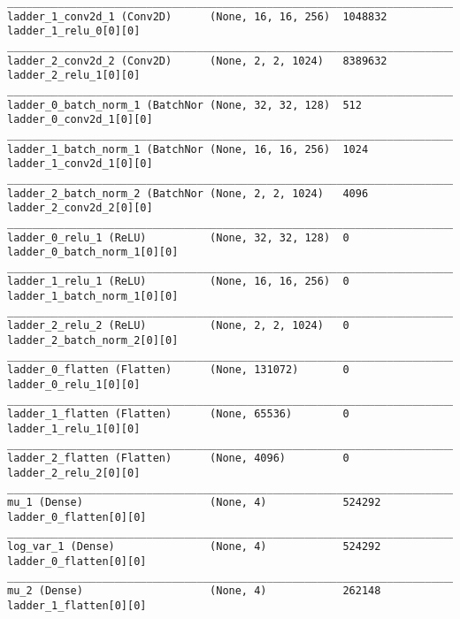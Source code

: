 \begin{lstlisting}[caption={\textsc{Mnist}-\ac{VLAE}-\ac{GAN} Encoder},captionpos=b,basicstyle=\tiny, label={lst:mnist-vlae-gan-encoder}]
__________________________________________________________________________________________________
ladder_1_conv2d_1 (Conv2D)      (None, 16, 16, 256)  1048832     ladder_1_relu_0[0][0]
__________________________________________________________________________________________________
ladder_2_conv2d_2 (Conv2D)      (None, 2, 2, 1024)   8389632     ladder_2_relu_1[0][0]
__________________________________________________________________________________________________
ladder_0_batch_norm_1 (BatchNor (None, 32, 32, 128)  512         ladder_0_conv2d_1[0][0]
__________________________________________________________________________________________________
ladder_1_batch_norm_1 (BatchNor (None, 16, 16, 256)  1024        ladder_1_conv2d_1[0][0]
__________________________________________________________________________________________________
ladder_2_batch_norm_2 (BatchNor (None, 2, 2, 1024)   4096        ladder_2_conv2d_2[0][0]
__________________________________________________________________________________________________
ladder_0_relu_1 (ReLU)          (None, 32, 32, 128)  0           ladder_0_batch_norm_1[0][0]
__________________________________________________________________________________________________
ladder_1_relu_1 (ReLU)          (None, 16, 16, 256)  0           ladder_1_batch_norm_1[0][0]
__________________________________________________________________________________________________
ladder_2_relu_2 (ReLU)          (None, 2, 2, 1024)   0           ladder_2_batch_norm_2[0][0]
__________________________________________________________________________________________________
ladder_0_flatten (Flatten)      (None, 131072)       0           ladder_0_relu_1[0][0]
__________________________________________________________________________________________________
ladder_1_flatten (Flatten)      (None, 65536)        0           ladder_1_relu_1[0][0]
__________________________________________________________________________________________________
ladder_2_flatten (Flatten)      (None, 4096)         0           ladder_2_relu_2[0][0]
__________________________________________________________________________________________________
mu_1 (Dense)                    (None, 4)            524292      ladder_0_flatten[0][0]
__________________________________________________________________________________________________
log_var_1 (Dense)               (None, 4)            524292      ladder_0_flatten[0][0]
__________________________________________________________________________________________________
mu_2 (Dense)                    (None, 4)            262148      ladder_1_flatten[0][0]

\end{lstlisting}
